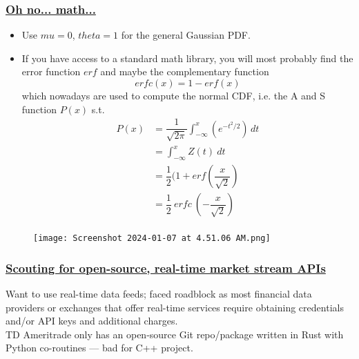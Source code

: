 \documentclass{assignment}
\begin{document}
\begin{problem}
\subsubsection*{\underline{Oh no... math...}}

\begin{itemize}
    \item Use $mu = 0$, $theta = 1$ for the general Gaussian PDF.
    \item If you have access to a standard math library, you will most probably find the error function $erf$ and maybe the complementary function $$erfc(x) = 1 - erf(x)$$ which nowadays are used to compute the normal CDF, i.e. the A and S function $P(x)$ s.t. 
    \begin{align*}
        P(x) & = \dfrac{1}{\sqrt{2\pi}} \int_{-\infty}^{x} (e^{-t^2 / 2}) \, dt \\
             & = \int_{-\infty}^{x} Z(t) \  dt \\
             & = \dfrac{1}{2} (1 + erf(\dfrac{x}{\sqrt{2}}) \\
             & = \dfrac{1}{2} \ erfc \ (- \dfrac{x}{\sqrt{2}}) \\
    \end{align*}
\end{itemize}


\begin{figure}
    \centering
    \texttt{[image: Screenshot 2024-01-07 at 4.51.06 AM.png]}
    \label{fig:enter-label}
\end{figure}


\subsubsection*{\underline{Scouting for open-source, real-time market stream APIs}}

\noindent Want to use real-time data feeds; faced roadblock as most financial data providers or exchanges that offer real-time services require obtaining credentials and/or API keys and additional charges. \\

\noindent TD Ameritrade only has an open-source Git repo/package written in Rust with Python co-routines — bad for C++ project. \\\\\


\end{problem}
\end{document}
